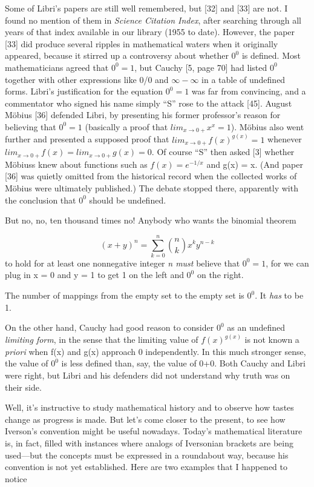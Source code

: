 \documentclass[10pt]{article}
\begin{document}
Some of Libri’s papers are still well remembered, but [32] and [33] are not. I found no mention
of them in \textit{Science Citation Index}, after searching through all years of that index available in our
library (1955 to date). However, the paper [33] did produce several ripples in mathematical waters
when it originally appeared, because it stirred up a controversy about whether $0^0$ is defined. Most
mathematicians agreed that $0^0 = 1$,  but Cauchy [5, page 70] had listed  $0^0$ together with other
expressions like 0/0 and $\infty - \infty$ in a table of undefined forms. Libri’s justification for the equation
 $0^0 = 1$ was far from  convincing, and a commentator who signed his name simply “S” rose to
the attack [45]. August Möbius  [36] defended Libri, by presenting his former professor’s reason
for believing that $0^0 = 1$ (basically a proof that $lim_{x \to 0+}x^x =1$). Möbius also went further and 
presented a supposed proof that $lim_{x \to 0+}f(x)^{g(x)} = 1$ whenever $lim_{x \to 0+}f(x) = lim_{x \to 0+}g(x) = 0$.
Of course “S” then asked [3] whether Möbiuss knew about functions such as $f(x) = e^{-1/x}$ and 
g(x) = x. (And paper [36] was quietly omitted from the historical record when the collected works
of Möbius were ultimately published.) The debate stopped there, apparently with the conclusion 
that $0^0$ should be undefined.

But no, no, ten thousand times no! Anybody who wants the binomial theorem

\begin{equation}
\tag{1.18}
(x+y)^n = \sum_{k=0}^{n}{{n} \choose {k}}x^{k}y^{n-k}
\end{equation}
to hold for at least one nonnegative integer \textit{n must} believe that $0^0 = 1$, for we can plug in x = 0 and 
y = 1 to get 1 on the left and $0^0$ on the right.

The number of mappings from the empty set to the empty set is $0^0$. It \textit{has} to be 1.

On the other hand, Cauchy had good reason to consider $0^0$ as an undefined \textit{limiting form}, in
the sense that the limiting value of $f(x)^{g(x)}$ is not known a \textit{priori} when f(x) and g(x) approach 0
independently. In this much stronger sense, the value of $0^0$ is less defined than, say, the value of 
0+0. Both Cauchy and Libri were right, but Libri and his defenders did not understand why truth
was on their side.

Well, it’s instructive to study mathematical history and to observe how tastes change as
progress is made. But let’s come closer to the present, to see how Iverson’s convention might
be useful nowadays. Today’s mathematical literature is, in fact, filled with instances where analogs
of Iversonian brackets are being used—but the concepts must be expressed in a roundabout way,
because his convention is not yet established. Here are two examples that I happened to notice
\end{document}
